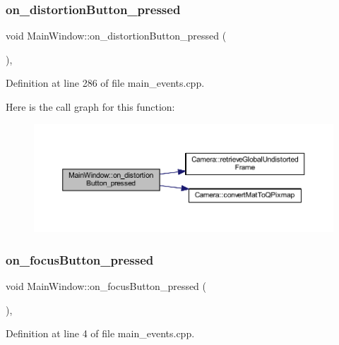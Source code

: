 \subsubsection{\texorpdfstring{on\_distortionButton\_pressed}{on\_distortionButton\_pressed}}
{\footnotesize\ttfamily void Main\+Window\+::on\+\_\+distortion\+Button\+\_\+pressed (\begin{DoxyParamCaption}{ }\end{DoxyParamCaption})\hspace{0.3cm}{\ttfamily [private]}, {\ttfamily [slot]}}



Definition at line 286 of file main\+\_\+events.\+cpp.

Here is the call graph for this function\+:
\nopagebreak
\begin{figure}[H]
\begin{center}
\leavevmode
\includegraphics[width=350pt]{class_main_window_ab98ee5c1e01d4db75d27e3f00c7c4b78_cgraph}
\end{center}
\end{figure}
\mbox{\label{class_main_window_a5e9d6c6b9249ee3478427d2e33dfb901}} 
\subsubsection{\texorpdfstring{on\_focusButton\_pressed}{on\_focusButton\_pressed}}
{\footnotesize\ttfamily void Main\+Window\+::on\+\_\+focus\+Button\+\_\+pressed (\begin{DoxyParamCaption}{ }\end{DoxyParamCaption})\hspace{0.3cm}{\ttfamily [private]}, {\ttfamily [slot]}}



Definition at line 4 of file main\+\_\+events.\+cpp.


